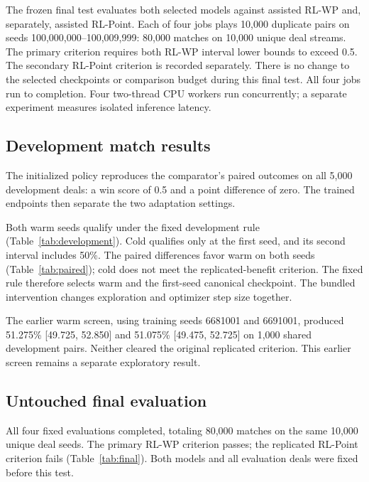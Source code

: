 The frozen final test evaluates both selected models against assisted RL-WP
and, separately, assisted RL-Point. Each of four jobs plays 10,000 duplicate
pairs on seeds 100,000,000--100,009,999: 80,000 matches on 10,000 unique deal
streams. The primary criterion requires both RL-WP interval lower bounds to
exceed 0.5. The secondary RL-Point criterion is recorded separately. There is
no change to the selected checkpoints or comparison budget during this final test.
All four jobs run to completion. Four two-thread CPU workers run concurrently;
a separate experiment measures isolated inference latency.

\subsection{Development match results}
The initialized policy reproduces the comparator's paired outcomes on all
5,000 development deals: a win score of 0.5 and a point difference of zero.
The trained endpoints then separate the two adaptation settings.

\begin{table}[ht]
\centering\small

\caption{Development results against assisted RL-WP. Every row uses the same
5,000 duplicate deal seeds. Point differences use candidate-minus-opponent units.}
\label{tab:development}
\end{table}

Both warm seeds qualify under the fixed development rule
(Table~\ref{tab:development}). Cold qualifies only at the first seed, and its
second interval includes 50\%. The paired differences favor warm on both
seeds (Table~\ref{tab:paired}); cold does not meet the replicated-benefit
criterion. The fixed rule therefore selects warm and the first-seed canonical
checkpoint. The bundled intervention changes exploration and optimizer step size together.

\begin{table}[ht]
\centering\small

\caption{Paired development differences. Negative values favor warm.}
\label{tab:paired}
\end{table}

The earlier warm screen, using training seeds 6681001 and 6691001, produced
51.275\% [49.725, 52.850] and 51.075\% [49.475, 52.725] on 1,000 shared
development pairs. Neither cleared the original replicated criterion.
This earlier screen remains a separate exploratory result.

\subsection{Untouched final evaluation}
All four fixed evaluations completed, totaling 80,000 matches on the same
10,000 unique deal seeds. The primary RL-WP criterion passes; the replicated RL-Point criterion fails
(Table~\ref{tab:final}). Both models and all evaluation deals were fixed before
this test.

